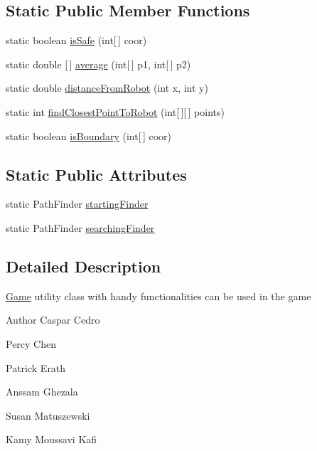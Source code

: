 \subsection*{Static Public Member Functions}
\begin{DoxyCompactItemize}
\item 
static boolean \hyperlink{classca_1_1mcgill_1_1ecse211_1_1project_1_1_game_util_a4b657445545fb1a814b6699724d72042}{is\+Safe} (int\mbox{[}$\,$\mbox{]} coor)
\item 
static double \mbox{[}$\,$\mbox{]} \hyperlink{classca_1_1mcgill_1_1ecse211_1_1project_1_1_game_util_ae5c5c445ab84516991219ca3783fcaa4}{average} (int\mbox{[}$\,$\mbox{]} p1, int\mbox{[}$\,$\mbox{]} p2)
\item 
static double \hyperlink{classca_1_1mcgill_1_1ecse211_1_1project_1_1_game_util_ae373ebc3ec91ed3bf9dd7304a482a3f5}{distance\+From\+Robot} (int x, int y)
\item 
static int \hyperlink{classca_1_1mcgill_1_1ecse211_1_1project_1_1_game_util_a6e0ee94b800ca3727ca8009782abda14}{find\+Closest\+Point\+To\+Robot} (int\mbox{[}$\,$\mbox{]}\mbox{[}$\,$\mbox{]} points)
\item 
static boolean \hyperlink{classca_1_1mcgill_1_1ecse211_1_1project_1_1_game_util_aa9819819c4de2ef025caac87d0c0b0db}{is\+Boundary} (int\mbox{[}$\,$\mbox{]} coor)
\end{DoxyCompactItemize}
\subsection*{Static Public Attributes}
\begin{DoxyCompactItemize}
\item 
static Path\+Finder \hyperlink{classca_1_1mcgill_1_1ecse211_1_1project_1_1_game_util_a84ec23eabf60cb20895815e7b390e3f2}{starting\+Finder}
\item 
static Path\+Finder \hyperlink{classca_1_1mcgill_1_1ecse211_1_1project_1_1_game_util_acedc99ad369450d6b2d7711c2d63027a}{searching\+Finder}
\end{DoxyCompactItemize}


\subsection{Detailed Description}
\hyperlink{enumca_1_1mcgill_1_1ecse211_1_1project_1_1_game}{Game} utility class with handy functionalities can be used in the game

\begin{DoxyAuthor}{Author}
Caspar Cedro 

Percy Chen 

Patrick Erath 

Anssam Ghezala 

Susan Matuszewski 

Kamy Moussavi Kafi 
\end{DoxyAuthor}


